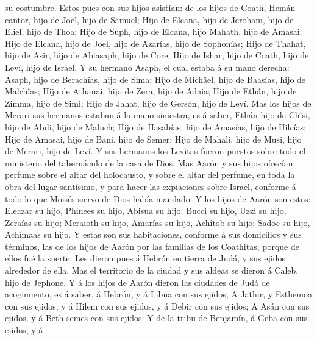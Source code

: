 su costumbre.  Estos pues con sus hijos asistían: de los
hijos de Coath, Hemán cantor, hijo de Joel, hijo de Samuel;
 Hijo de Elcana, hijo de Jeroham, hijo de Eliel, hijo de
Thoa;  Hijo de Suph, hijo de Elcana, hijo Mahath, hijo de
Amasai;  Hijo de Elcana, hijo de Joel, hijo de Azarías,
hijo de Sophonías;  Hijo de Thahat, hijo de Asir, hijo de
Abiasaph, hijo de Core;  Hijo de Ishar, hijo de Coath,
hijo de Leví, hijo de Israel.  Y su hermano Asaph, el
cual estaba á su mano derecha: Asaph, hijo de Berachîas, hijo de Sima;
 Hijo de Michâel, hijo de Baasías, hijo de Malchîas;
 Hijo de Athanai, hijo de Zera, hijo de Adaia;
 Hijo de Ethán, hijo de Zimma, hijo de Simi;
 Hijo de Jahat, hijo de Gersón, hijo de Leví.
 Mas los hijos de Merari sus hermanos estaban á la mano
siniestra, es á saber, Ethán hijo de Chîsi, hijo de Abdi, hijo de
Maluch;  Hijo de Hasabías, hijo de Amasías, hijo de
Hilcías;  Hijo de Amasai, hijo de Bani, hijo de Semer;
 Hijo de Mahali, hijo de Musi, hijo de Merari, hijo de
Leví.  Y sus hermanos los Levitas fueron puestos sobre
todo el ministerio del tabernáculo de la casa de Dios. 
Mas Aarón y sus hijos ofrecían perfume sobre el altar del holocausto, y
sobre el altar del perfume, en toda la obra del lugar santísimo, y para
hacer las expiaciones sobre Israel, conforme á todo lo que Moisés siervo
de Dios había mandado.  Y los hijos de Aarón son estos:
Eleazar su hijo, Phinees su hijo, Abisua su hijo;  Bucci
su hijo, Uzzi su hijo, Zeraías su hijo;  Meraioth su
hijo, Amarías su hijo, Achîtob su hijo;  Sadoc su hijo,
Achîmaas su hijo.  Y estas son sus habitaciones, conforme
á sus domicilios y sus términos, las de los hijos de Aarón por las
familias de los Coathitas, porque de ellos fué la suerte:
 Les dieron pues á Hebrón en tierra de Judá, y sus ejidos
alrededor de ella.  Mas el territorio de la ciudad y sus
aldeas se dieron á Caleb, hijo de Jephone.  Y á los hijos
de Aarón dieron las ciudades de Judá de acogimiento, es á saber, á
Hebrón, y á Libna con sus ejidos;  A Jathir, y Esthemoa
con sus ejidos, y á Hilem con sus ejidos, y á Debir con sus ejidos;
 A Asán con sus ejidos, y á Beth-semes con sus ejidos:
 Y de la tribu de Benjamín, á Geba con sus ejidos, y á
